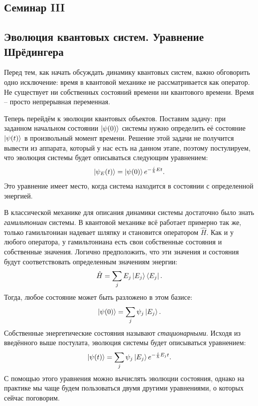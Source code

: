 \begin{center}
    \section{Семинар III}
\end{center}
\subsection{Эволюция квантовых систем. Уравнение Шрёдингера}
\hspace{1em} Перед тем, как начать обсуждать динамику квантовых систем, важно обговорить одно исключение: время в квантовой механике не рассматривается как оператор. Не существует ни собственных состояний времени ни квантового времени. Время – просто непрерывная переменная.

Теперь перейдём к эволюции квантовых объектов. Поставим задачу: при заданном начальном состоянии $\ket{\psi(0)}$ системы нужно определить её состояние $\ket{\psi(t)}$ в произвольный момент времени. Решение этой задачи не получится вывести из аппарата, который у нас есть на данном этапе, поэтому постулируем, что эволюция системы будет описываться следующим уравнением:
\[
\ket{\psi_E(t)} = \ket{\psi(0)} e^{-\frac{i}{\hbar} E t}.
\]
Это уравнение имеет место, когда система находится в состоянии с определенной энергией.

В классической механике для описания динамики системы достаточно было знать \textit{гамильтониан} системы. В квантовой механике всё работает примерно так же, только гамильтониан надевает шляпку и становится оператором $\hat{H}$. Как и у любого оператора, у гамильтониана есть свои собственные состояния и собственные значения. Логично предположить, что эти значения и состояния будут соответствовать определенным значениям энергии:
\[
\hat{H} = \sum_j E_j \ket{E_j} \bra{E_j}.
\]
Тогда, любое состояние может быть разложено в этом базисе:
\[
\ket{\psi(0)} = \sum_j \psi_j \ket{E_j}.
\]
Собственные энергетические состояния называют \textit{стационарными}. Исходя из введённого выше постулата, эволюция системы будет описываться уравнением:
\[
\ket{\psi(t)} = \sum_j \psi_j \ket{E_j} e^{-\frac{i}{\hbar} E_j t}.
\]
С помощью этого уравнения можно вычислять эволюции состояния, однако на практике мы чаще будем пользоваться двумя другими уравнениями, о которых сейчас поговорим.

